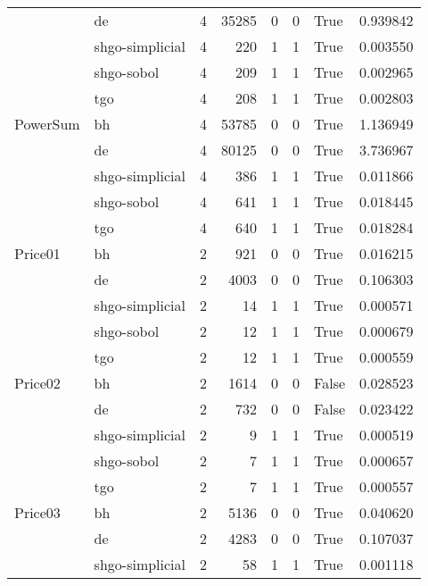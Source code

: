 \begin{longtable}{llrrrrlr}
         & de &     4 &    35285 &      0 &       0 &    True &    0.939842 \\
         & shgo-simplicial &     4 &      220 &      1 &       1 &    True &    0.003550 \\
         & shgo-sobol &     4 &      209 &      1 &       1 &    True &    0.002965 \\
         & tgo &     4 &      208 &      1 &       1 &    True &    0.002803 \\
PowerSum & bh &     4 &    53785 &      0 &       0 &    True &    1.136949 \\
         & de &     4 &    80125 &      0 &       0 &    True &    3.736967 \\
         & shgo-simplicial &     4 &      386 &      1 &       1 &    True &    0.011866 \\
         & shgo-sobol &     4 &      641 &      1 &       1 &    True &    0.018445 \\
         & tgo &     4 &      640 &      1 &       1 &    True &    0.018284 \\
Price01 & bh &     2 &      921 &      0 &       0 &    True &    0.016215 \\
         & de &     2 &     4003 &      0 &       0 &    True &    0.106303 \\
         & shgo-simplicial &     2 &       14 &      1 &       1 &    True &    0.000571 \\
         & shgo-sobol &     2 &       12 &      1 &       1 &    True &    0.000679 \\
         & tgo &     2 &       12 &      1 &       1 &    True &    0.000559 \\
Price02 & bh &     2 &     1614 &      0 &       0 &   False &    0.028523 \\
         & de &     2 &      732 &      0 &       0 &   False &    0.023422 \\
         & shgo-simplicial &     2 &        9 &      1 &       1 &    True &    0.000519 \\
         & shgo-sobol &     2 &        7 &      1 &       1 &    True &    0.000657 \\
         & tgo &     2 &        7 &      1 &       1 &    True &    0.000557 \\
Price03 & bh &     2 &     5136 &      0 &       0 &    True &    0.040620 \\
         & de &     2 &     4283 &      0 &       0 &    True &    0.107037 \\
         & shgo-simplicial &     2 &       58 &      1 &       1 &    True &    0.001118 \\

\end{longtable}
